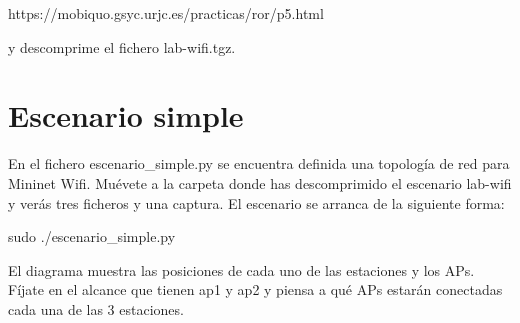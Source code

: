 \documentclass[12pt, a4paper]{report}
\begin{document}
\begin{center}
https://mobiquo.gsyc.urjc.es/practicas/ror/p5.html
\end{center}

y descomprime el fichero lab-wifi.tgz.

\chapter{Escenario simple}
En el fichero escenario\_simple.py se encuentra definida una topología de red para Mininet Wifi.
Muévete a la carpeta donde has descomprimido el escenario lab-wifi y verás tres ficheros y una
captura. El escenario se arranca de la siguiente forma:
\begin{center}
	sudo ./escenario\_simple.py
\end{center}
El diagrama muestra las posiciones de cada uno de las estaciones y los APs. Fíjate en el alcance
que tienen ap1 y ap2 y piensa a qué APs estarán conectadas cada una de las 3 estaciones.
\end{document}
